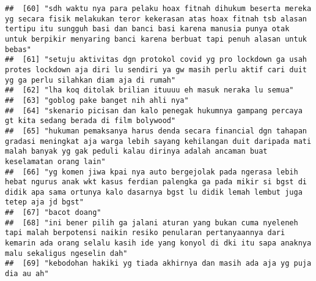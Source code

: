 \documentclass[
]{article}
\begin{document}
\begin{verbatim}
##  [60] "sdh waktu nya para pelaku hoax fitnah dihukum beserta mereka yg secara fisik melakukan teror kekerasan atas hoax fitnah tsb alasan tertipu itu sungguh basi dan banci basi karena manusia punya otak untuk berpikir menyaring banci karena berbuat tapi penuh alasan untuk bebas"  
##  [61] "setuju aktivitas dgn protokol covid yg pro lockdown ga usah protes lockdown aja diri lu sendiri ya gw masih perlu aktif cari duit yg ga perlu silahkan diam aja di rumah"                                                                                                          
##  [62] "lha koq ditolak brilian ituuuu eh masuk neraka lu semua"                                                                                                                                                                                                                           
##  [63] "goblog pake banget nih ahli nya"                                                                                                                                                                                                                                                   
##  [64] "skenario picisan dan kalo penegak hukumnya gampang percaya gt kita sedang berada di film bolywood"                                                                                                                                                                                 
##  [65] "hukuman pemaksanya harus denda secara financial dgn tahapan gradasi meningkat aja warga lebih sayang kehilangan duit daripada mati malah banyak yg gak peduli kalau dirinya adalah ancaman buat keselamatan orang lain"                                                            
##  [66] "yg komen jiwa kpai nya auto bergejolak pada ngerasa lebih hebat ngurus anak wkt kasus ferdian palengka ga pada mikir si bgst di didik apa sama ortunya kalo dasarnya bgst lu didik lemah lembut juga tetep aja jd bgst"                                                            
##  [67] "bacot doang"                                                                                                                                                                                                                                                                       
##  [68] "ini bener pilih ga jalani aturan yang bukan cuma nyeleneh tapi malah berpotensi naikin resiko penularan pertanyaannya dari kemarin ada orang selalu kasih ide yang konyol di dki itu sapa anaknya malu sekaligus ngeselin dah"                                                     
##  [69] "kebodohan hakiki yg tiada akhirnya dan masih ada aja yg puja dia au ah"                                                                                                                                                                                                            

\end{verbatim}
\end{document}
